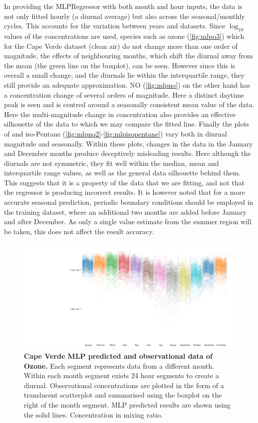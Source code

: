 In providing the MLPRegressor with both month and hour inputs, the data is not only fitted hourly (a diurnal average) but also across the seasonal/monthly cycles. This accounts for the variation between years and datasets. Since $\log_{10}$ values of the concentrations are used, species such as ozone (\autoref{fig:mlpo3}) which for the Cape Verde dataset (clean air) do not change more than one order of magnitude, the effects of neighbouring months, which shift the diurnal away from the mean (the green line on the boxplot), can be seen. However since this is overall a small change, and the diurnals lie within the interquartile range, they still provide an adequate approximation. NO (\autoref{fig:mlpno}) on the other hand has a concentration change of several orders of magnitude. Here a distinct daytime peak is seen and is centred around a seasonally consistent mean value of the data. Here the multi-magnitude change in concentration also provides an effective silhouette of the data to which we may compare the fitted line. 
Finally the plots of  and iso-Pentane (\autoref{fig:mlpno2}-\ref{fig:mlpisopentane}) vary both in diurnal magnitude and seasonally. Within these plots, changes in the data in the January and December months produce deceptively misleading results. Here although the diurnals are not symmetric, they fit well within the median, mean and interquartile range values, as well as the general data silhouette behind them. This suggests that it is a property of the data that we are fitting, and not that the regressor is producing incorrect results. It is however noted that for a more accurate seasonal prediction, periodic boundary conditions should be employed in the training dataset, where an additional two months are added before January and after December. As only a single value estimate from the summer region will be taken, this does not affect the result accuracy. 

\begin{figure}[H]
     \centering
         \includegraphics[width=.90\textheight,angle =90,trim={8cm 0 0 0}]{figures_c3/mlpregressor/CVNOX_CapeVerde/O3.pdf}
        \caption{\textbf{Cape Verde MLP predicted and observational data of Ozone.} Each segment represents data from a different month. Within each month segment exists 24 hour segments to create a diurnal. Observational concentrations are plotted in the form of a translucent scatterplot and summarised using the boxplot on the right of the month segment. MLP predicted results are shown using the solid lines. Concentration in mixing ratio.}
        \label{fig:mlpo3}
\end{figure}

